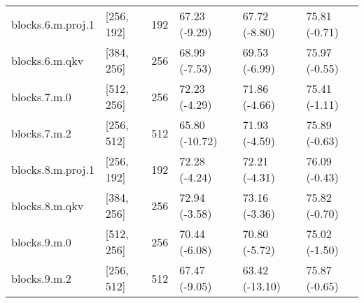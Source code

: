 \begin{tabular}{llrlll}
 blocks.6.m.proj.1 &  [256, 192] &  192 &  67.23 (-9.29) &  67.72 (-8.80) &  75.81 (-0.71) \\
    blocks.6.m.qkv &  [384, 256] &  256 &  68.99 (-7.53) &  69.53 (-6.99) &  75.97 (-0.55) \\
      blocks.7.m.0 &  [512, 256] &  256 &  72.23 (-4.29) &  71.86 (-4.66) &  75.41 (-1.11) \\
      blocks.7.m.2 &  [256, 512] &  512 & 65.80 (-10.72) &  71.93 (-4.59) &  75.89 (-0.63) \\
 blocks.8.m.proj.1 &  [256, 192] &  192 &  72.28 (-4.24) &  72.21 (-4.31) &  76.09 (-0.43) \\
    blocks.8.m.qkv &  [384, 256] &  256 &  72.94 (-3.58) &  73.16 (-3.36) &  75.82 (-0.70) \\
      blocks.9.m.0 &  [512, 256] &  256 &  70.44 (-6.08) &  70.80 (-5.72) &  75.02 (-1.50) \\
      blocks.9.m.2 &  [256, 512] &  512 &  67.47 (-9.05) & 63.42 (-13.10) &  75.87 (-0.65) \\
\bottomrule
\end{tabular}
